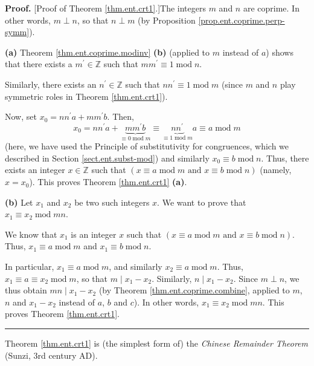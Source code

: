 \documentclass[numbers=enddot,12pt,final,onecolumn,notitlepage]{scrartcl}%
\numberwithin{exer}{subsection}
\theoremstyle{definition}
\newenvironment{proof}[1][Proof]{\noindent\textbf{#1.} }{\ \rule{0.5em}{0.5em}}
\newenvironment{noncompile}{}{}
\begin{document}
\begin{proof}
[Proof of Theorem \ref{thm.ent.crt1}.]The integers $m$ and $n$ are coprime. In
other words, $m\perp n$, so that $n\perp m$ (by Proposition
\ref{prop.ent.coprime.perp-symm}).

\textbf{(a)} Theorem \ref{thm.ent.coprime.modinv} \textbf{(b)} (applied to $m$
instead of $a$) shows that there exists a $m^{\prime}\in\mathbb{Z}$ such that
$mm^{\prime}\equiv1\operatorname{mod}n$.

Similarly, there exists an $n^{\prime}\in\mathbb{Z}$ such that $nn^{\prime
}\equiv1\operatorname{mod}m$ (since $m$ and $n$ play symmetric roles in
Theorem \ref{thm.ent.crt1}).

Now, set $x_{0}=nn^{\prime}a+mm^{\prime}b$. Then,%
\[
x_{0}=nn^{\prime}a+\underbrace{mm^{\prime}b}_{\equiv0\operatorname{mod}%
m}\equiv\underbrace{nn^{\prime}}_{\equiv1\operatorname{mod}m}a\equiv
a\operatorname{mod}m
\]
(here, we have used the Principle of substitutivity for congruences, which we
described in Section \ref{sect.ent.subst-mod}) and similarly $x_{0}\equiv
b\operatorname{mod}n$. Thus, there exists an integer $x\in\mathbb{Z}$ such
that \newline$\left(  x\equiv a\operatorname{mod}m\text{ and }x\equiv
b\operatorname{mod}n\right)  $ (namely, $x=x_{0}$). This proves Theorem
\ref{thm.ent.crt1} \textbf{(a)}.

\textbf{(b)} Let $x_{1}$ and $x_{2}$ be two such integers $x$. We want to
prove that $x_{1}\equiv x_{2}\operatorname{mod}mn$.

We know that $x_{1}$ is an integer $x$ such that $\left(  x\equiv
a\operatorname{mod}m\text{ and }x\equiv b\operatorname{mod}n\right)  $. Thus,
$x_{1}\equiv a\operatorname{mod}m$ and $x_{1}\equiv b\operatorname{mod}n$.

In particular, $x_{1}\equiv a\operatorname{mod}m$, and similarly $x_{2}\equiv
a\operatorname{mod}m$. Thus, $x_{1}\equiv a\equiv x_{2}\operatorname{mod}m$,
so that $m\mid x_{1}-x_{2}$. Similarly, $n\mid x_{1}-x_{2}$. Since $m\perp n$,
we thus obtain $mn\mid x_{1}-x_{2}$ (by Theorem \ref{thm.ent.coprime.combine},
applied to $m$, $n$ and $x_{1}-x_{2}$ instead of $a$, $b$ and $c$). In other
words, $x_{1}\equiv x_{2}\operatorname{mod}mn$. This proves Theorem
\ref{thm.ent.crt1}.
\end{proof}

\begin{noncompile}
Theorem \ref{thm.ent.crt1} is (the simplest form of) the \textit{Chinese
Remainder Theorem} (Sunzi, 3rd century AD).
\end{noncompile}
\end{document}
